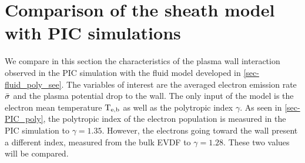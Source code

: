 
\FloatBarrier

\section{Comparison of the sheath model with PIC simulations} \label{subsec-picandmodel}

% 

We compare in this section the characteristics of the plasma wall interaction observed in the \ac{PIC} simulation with the fluid model developed in \cref{sec-fluid_poly_see}.
The variables of interest are the averaged electron emission rate $ \bar{\sigma }$ and the plasma potential drop to the wall.
The only input of the model is the electron mean temperature $\mathrm{T_{e, b}}$ as well as the polytropic index $\gamma$.
As seen in \cref{sec-PIC_poly}, the polytropic index of the electron population is measured in the \ac{PIC} simulation to $\gamma=1.35$.
However, the electrons going toward the wall present a different index, measured from the bulk \ac{EVDF} to $\gamma=1.28$.
These two values will be compared.
